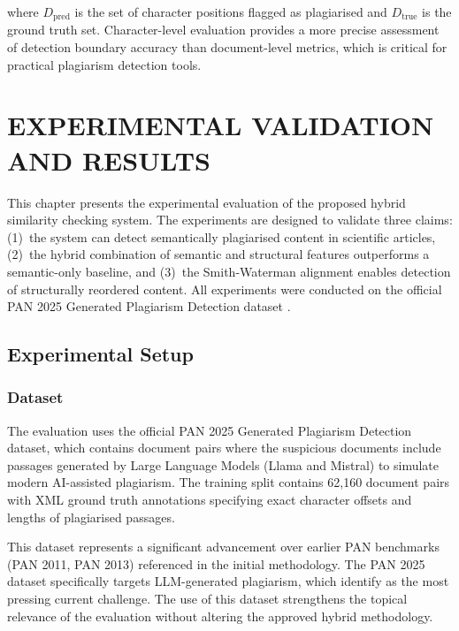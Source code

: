 \documentclass[12pt, a4paper]{article}
\begin{document}
\noindent where $D_{\text{pred}}$ is the set of character positions flagged as plagiarised and $D_{\text{true}}$ is the ground truth set. Character-level evaluation provides a more precise assessment of detection boundary accuracy than document-level metrics, which is critical for practical plagiarism detection tools.

\newpage
\section{EXPERIMENTAL VALIDATION AND RESULTS}

This chapter presents the experimental evaluation of the proposed hybrid similarity checking system. The experiments are designed to validate three claims: (1)~the system can detect semantically plagiarised content in scientific articles, (2)~the hybrid combination of semantic and structural features outperforms a semantic-only baseline, and (3)~the Smith-Waterman alignment enables detection of structurally reordered content. All experiments were conducted on the official PAN 2025 Generated Plagiarism Detection dataset \citep{GreinerPetter2025}.

\subsection{Experimental Setup}

\subsubsection{Dataset}

The evaluation uses the official PAN 2025 Generated Plagiarism Detection dataset, which contains document pairs where the suspicious documents include passages generated by Large Language Models (Llama and Mistral) to simulate modern AI-assisted plagiarism. The training split contains 62,160 document pairs with XML ground truth annotations specifying exact character offsets and lengths of plagiarised passages.

This dataset represents a significant advancement over earlier PAN benchmarks (PAN 2011, PAN 2013) referenced in the initial methodology. The PAN 2025 dataset specifically targets LLM-generated plagiarism, which \citet{GreinerPetter2025} identify as the most pressing current challenge. The use of this dataset strengthens the topical relevance of the evaluation without altering the approved hybrid methodology.
\end{document}
